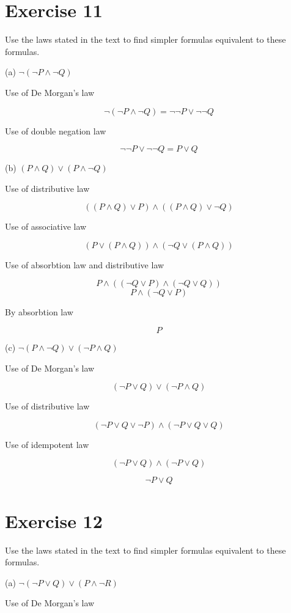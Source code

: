\documentclass[11pt]{article}
\begin{document}
\section*{Exercise 11}

Use the laws stated in the text to find simpler formulas equivalent to these formulas.

\noindent (a) $\neg (\neg P \wedge \neg Q) $

Use of De Morgan's law

$$\neg (\neg P \wedge \neg Q) = \neg \neg P \vee \neg \neg Q$$

Use of double negation law

$$\neg \neg P \vee \neg \neg Q = P \vee Q$$

\noindent (b) $(P \wedge Q) \vee (P \wedge \neg Q)$

Use of distributive law

$$((P \wedge Q) \vee P) \wedge ((P \wedge Q) \vee \neg Q)$$

Use of associative law

$$(P \vee (P \wedge Q)) \wedge (\neg Q \vee (P \wedge Q))$$

Use of absorbtion law and distributive law

$$P \wedge ((\neg Q \vee P) \wedge (\neg Q \vee Q))$$
$$P \wedge (\neg Q \vee P)$$

By absorbtion law

$$P$$ 

\noindent (c) $\neg (P \wedge \neg Q) \vee (\neg P \wedge Q)$

Use of De Morgan's law

$$(\neg P \vee Q) \vee (\neg P \wedge Q)$$

Use of distributive law

$$(\neg P \vee Q \vee \neg P) \wedge (\neg P \vee Q \vee Q)$$

Use of idempotent law

$$(\neg P \vee Q) \wedge (\neg P \vee Q)$$

$$\neg P \vee Q$$

\section*{Exercise 12}

Use the laws stated in the text to find simpler formulas equivalent to these formulas.

\noindent (a) $\neg (\neg P \vee Q) \vee (P \wedge \neg R)$

Use of De Morgan's law
\end{document}
